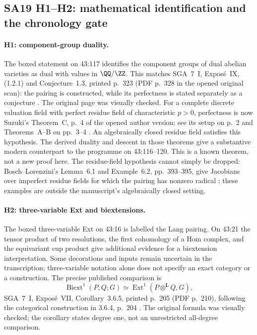 \subsection{SA19 H1--H2: mathematical identification and the chronology gate}

\paragraph{H1: component-group duality.}
The boxed statement on 43:117 identifies the component groups of dual
abelian varieties as dual with values in $\QQ/\ZZ$. This matches
SGA~7~I, Expos\'e~IX, (1.2.1) and Conjecture~1.3, printed p.~323
(PDF p.~328 in the opened original scan): the pairing is constructed,
while its perfectness is stated separately as a conjecture
\cite{SGA7I}. The original page was visually checked.
For a complete discrete valuation field with perfect residue field of
characteristic $p>0$, perfectness is now Suzuki's Theorem~C,
p.~4 of the opened author version; see its setup on p.~2 and
Theorems~A--B on pp.~3--4 \cite{SuzukiPairing2020}.
An algebraically closed residue field satisfies this hypothesis.
The derived duality and descent in those theorems give a substantive
modern counterpart to the programme on 43:116--120. This is a
known theorem, not a new proof here. The residue-field hypothesis
cannot simply be dropped: Bosch--Lorenzini's Lemma~6.1 and
Example~6.2, pp.~393--395, give Jacobians over imperfect residue
fields for which the pairing has nonzero radical
\cite{BoschLorenzini2002}; these examples are outside the manuscript's
algebraically closed setting.

\paragraph{H2: three-variable Ext and biextensions.}
The boxed three-variable Ext on 43:16 is labelled the Lang pairing.
On 43:21 the tensor product of two resolutions, the first cohomology
of a Hom complex, and the equivariant cup product give additional
evidence for a biextension interpretation. Some decorations and
inputs remain uncertain in the transcription; three-variable
notation alone does not specify an exact category or a construction.
The precise published comparison is
\[
 \operatorname{Biext}^{1}(P,Q;G)
   \simeq \operatorname{Ext}^{1}(P\mathbin{\otimes}^{\mathbf L}Q,G),
\]
SGA~7~I, Expos\'e~VII, Corollary~3.6.5, printed p.~205
(PDF p.~210), following the categorical construction in 3.6.4,
p.~204 \cite{SGA7I}. The original formula was visually checked;
the corollary states degree one, not an unrestricted all-degree
comparison.

